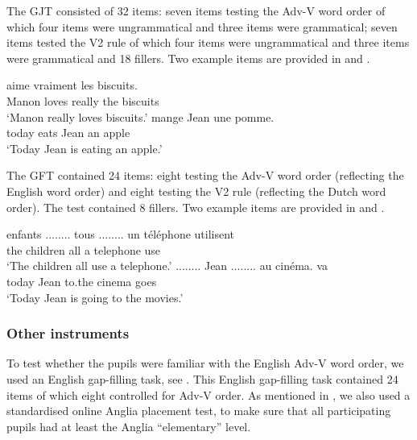\documentclass[output=paper]{langsci/langscibook}
\begin{document}
The GJT consisted of 32 items: seven items testing the Adv-V word order of which four items were ungrammatical and three items were grammatical; seven items tested the V2 rule of which four items were ungrammatical and three items were grammatical and 18 fillers. Two example items are provided in  and .

  \settowidth{}
  \ea%
  \label{ex:stadt:2}
   {aime} {vraiment} {les} {biscuits.}\\
  		Manon loves really     the biscuits\\
  \glt ‘Manon really loves biscuits.’
  \ex %
  \label{ex:stadt:3}
   {mange} {Jean} {une} {pomme.}\\
		  today eats Jean an apple\\
  \glt ‘Today Jean is eating an apple.’
  \z



The GFT contained 24 items: eight testing the Adv-V word order (reflecting the English word order) and eight testing the V2 rule (reflecting the Dutch word order). The test contained 8 fillers. Two example items are provided in  and .


  \ea%
  \label{ex:stadt:4}
   {enfants} {........} tous {........} un téléphone utilisent\\
  	the children {}             all {}           a telephone use\\
  \glt ‘The children all use a telephone.’
  \ex %
  \label{ex:stadt:5}
   {........} {Jean} {........} {au} {cinéma.} {va} \\
 		 today {}          Jean {}           to.the cinema goes\\
  \glt ‘Today Jean is going to the movies.’
  \z


\subsubsection{Other instruments}
\label{sec:stadt:3.3.2}

To test whether the pupils were familiar with the English Adv-V word order, we used an English gap-filling task, see . This English gap-filling task contained 24 items of which eight controlled for Adv-V order. As mentioned in , we also used a standardised online Anglia placement test, to make sure that all participating pupils had at least the Anglia ``elementary'' level.
\end{document}
